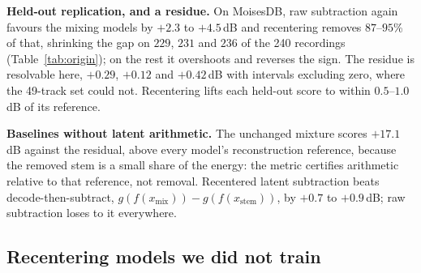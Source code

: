 \documentclass[conference]{IEEEtran}
\newcommand{\tabref}[1]{Table~\ref{#1}}
\begin{document}
\textbf{Held-out replication, and a residue.} On MoisesDB, raw subtraction
again favours the mixing models by $+2.3$ to $+4.5$\,dB and recentering
removes $87$--$95$\% of that, shrinking the gap on $229$, $231$ and $236$ of
the 240 recordings (\tabref{tab:origin}); on the rest it overshoots and
reverses the sign. The residue is resolvable here, $+0.29$, $+0.12$ and
$+0.42$\,dB with intervals excluding zero, where the 49-track set could not.
Recentering lifts each held-out score to within $0.5$--$1.0$\,dB of its
reference.


\textbf{Baselines without latent arithmetic.} The unchanged mixture scores
$+17.1$\,dB against the residual, above every model's reconstruction
reference, because the removed stem is a small share of the energy: the
metric certifies arithmetic relative to that reference, not removal.
Recentered latent subtraction beats decode-then-subtract,
$g(f(x_\mathrm{mix})){-}g(f(x_\mathrm{stem}))$, by $+0.7$ to $+0.9$\,dB; raw
subtraction loses to it everywhere.

\subsection{Recentering models we did not train}\label{sec:codecs}

\begin{table}[t]
  \centering\small
  \setlength{\tabcolsep}{3.0pt}
  
  \caption{Recentering on autoencoders trained without any linearity
  objective, and on the public models of \cite{torres2026linearity}. Latent
  stem subtraction (SI-SDR, dB) in raw and recentered coordinates, the paired
  change, and the reference: each model's own reconstruction of the residual,
  scored against the true residual. $^{\ast}$MoisesDB held-out corpus (MUSDB
  is DAC training data); all others MUSDB18 test. $^{\dagger}$Consistency
  decoders: raw and recentered scores are decode-versus-decode with shared
  noise, as in \cite{torres2026linearity}; their near-zero reference shows the
  phase incoherence that makes the waveform score uninformative.}
  \label{tab:codecs}
\end{table}
\end{document}

